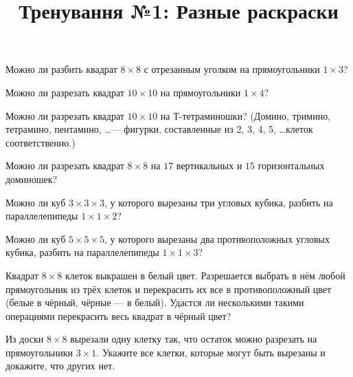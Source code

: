 


\title{Тренування №1: Разные раскраски}
\maketitle
\begin{problem}
	Можно ли разбить квадрат $8 \times 8$ с отрезанным уголком на прямоугольники $1 \times 3$?

\end{problem}

\begin{problem}
	Можно ли разрезать квадрат $10 \times 10$ на прямоугольники $1 \times 4$?
\end{problem}

\begin{problem}
	Можно ли разрезать квадрат $10 \times 10$ на Т-тетраминошки? (Домино, тримино,
тетрамино, пентамино, \dots --- фигурки, составленные из 2, 3, 4, 5, \dots клеток
соответственно.)
\end{problem}

\begin{problem}
	Можно ли разрезать квадрат $8 \times 8$ на $17$ вертикальных и $15$ горизонтальных доминошек?
\end{problem}

\begin{problem}
	Можно ли куб $3 \times 3 \times 3$, у которого вырезаны три угловых кубика, разбить на параллелепипеды $1 \times 1 \times 2$?
\end{problem}

\begin{problem}
	Можно ли куб $5 \times 5 \times 5$, у которого вырезаны два противоположных угловых кубика, разбить на параллелепипеды $1 \times 1 \times 3$?
\end{problem}

\begin{problem}
	Квадрат $8 \times 8$ клеток выкрашен в белый цвет. Разрешается выбрать в нём любой прямоугольник из трёх клеток и перекрасить их все в противоположный цвет (белые в чёрный, чёрные --- в белый). Удастся ли несколькими такими операциями перекрасить весь квадрат в чёрный цвет?
\end{problem}

\begin{problem}
	Из доски $8 \times 8$ вырезали одну клетку так, что остаток можно разрезать на прямоугольники $3 \times 1$. Укажите все клетки, которые могут быть вырезаны и докажите, что других нет.
\end{problem}

